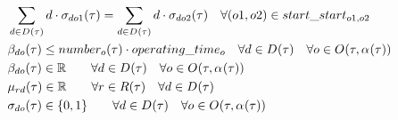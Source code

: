 \begin{alignat}{2}
	& \sum_{\ElementDays \in \SetDays{}} \ElementDays \cdot \VarTacticalWorkBinary{\ElementDays}{\ElementOperation1} = \sum_{\ElementDays \in \SetDays{}} \ElementDays \cdot \VarTacticalWorkBinary{\ElementDays}{\ElementOperation2}                                     \quad \forall (o1, \ElementOperation2) \in \ParStartStart                                                                                                                                                                                                                                  \\ 
	& \VarTacticalWork{\ElementDays}{\ElementOperation} \leq \ParNumberOfPeople \cdot \ParOperatingTime                                                                                                                                                                   \quad \forall \ElementDays \in \SetDays{} \quad \forall \ElementOperation \in \SetOperation{}{\VarStrategicWorkOrderAssignment{}{}}                                                                                                                                                        \\
	& \VarTacticalWork{\ElementDays}{\ElementOperation} \in \mathbb{R} \quad                                                                                                                                                                                            \quad \forall \ElementDays \in \SetDays{} \quad \forall \ElementOperation \in \SetOperation{}{\VarStrategicWorkOrderAssignment{}{}}                                                                                                                                                        \\
	& \VarTacticalExcess \in \mathbb{R} \quad                                                                                                                                                                                                                           \quad \forall r \in \SetResource \quad \forall \ElementDays \in \SetDays{}                                                                                                                                                                                                                 \\
	& \VarTacticalWorkBinary{\ElementDays}{\ElementOperation} \in \{0, 1\}\quad                                                                                                                                                                                         \quad \forall \ElementDays \in \SetDays{} \quad \forall \ElementOperation \in \SetOperation{}{\VarStrategicWorkOrderAssignment{}{}}                                                                                                                                                        \\

\end{alignat}
